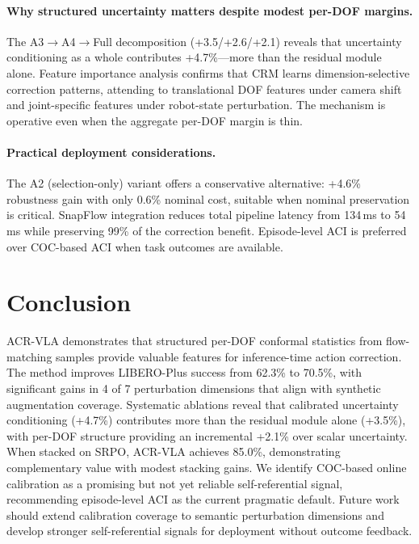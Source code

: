 \documentclass[letterpaper]{article}
\begin{document}
\paragraph{Why structured uncertainty matters despite modest per-DOF margins.}
The A3$\rightarrow$A4$\rightarrow$Full decomposition (+3.5/+2.6/+2.1) reveals that uncertainty conditioning as a whole contributes +4.7\%---more than the residual module alone.
Feature importance analysis confirms that CRM learns dimension-selective correction patterns, attending to translational DOF features under camera shift and joint-specific features under robot-state perturbation.
The mechanism is operative even when the aggregate per-DOF margin is thin.

\paragraph{Practical deployment considerations.}
The A2 (selection-only) variant offers a conservative alternative: +4.6\% robustness gain with only 0.6\% nominal cost, suitable when nominal preservation is critical.
SnapFlow integration reduces total pipeline latency from 134\,ms to 54\,ms while preserving 99\% of the correction benefit.
Episode-level ACI is preferred over COC-based ACI when task outcomes are available.

\section{Conclusion}
\label{sec:conclusion}

ACR-VLA demonstrates that structured per-DOF conformal statistics from flow-matching samples provide valuable features for inference-time action correction.
The method improves LIBERO-Plus success from 62.3\% to 70.5\%, with significant gains in 4 of 7 perturbation dimensions that align with synthetic augmentation coverage.
Systematic ablations reveal that calibrated uncertainty conditioning (+4.7\%) contributes more than the residual module alone (+3.5\%), with per-DOF structure providing an incremental +2.1\% over scalar uncertainty.
When stacked on SRPO, ACR-VLA achieves 85.0\%, demonstrating complementary value with modest stacking gains.
We identify COC-based online calibration as a promising but not yet reliable self-referential signal, recommending episode-level ACI as the current pragmatic default.
Future work should extend calibration coverage to semantic perturbation dimensions and develop stronger self-referential signals for deployment without outcome feedback.
\end{document}
